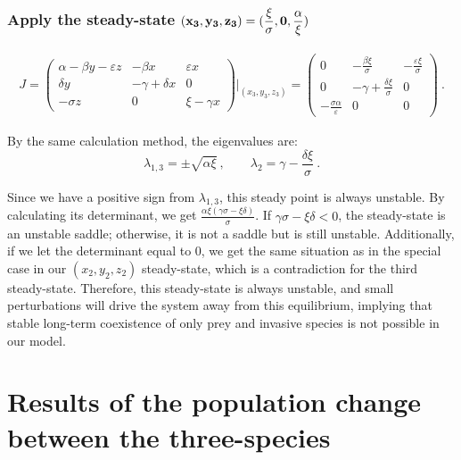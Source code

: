 \documentclass{article}
\begin{document}
\subsubsection*{Apply the steady-state $\bf(x_3,y_3,z_3) = (\dfrac{\xi}{\sigma}, 0, \dfrac{\alpha}{\xi})$}

\begin{align}
J = \begin{pmatrix}
\alpha - \beta y - \varepsilon z & -\beta x & \varepsilon x \\
\delta y & -\gamma + \delta x  & 0\\
- \sigma z & 0 & \xi - \gamma x
\end{pmatrix}\Big|_{(x_3, y_3,z_3)}
= \begin{pmatrix}
0 & -\frac{\beta \xi}{\sigma} & -\frac{\varepsilon \xi}{\sigma} \\
0 & -\gamma + \frac{\delta \xi}{\sigma} & 0\\
-\frac{\sigma \alpha}{\varepsilon} & 0 & 0
\end{pmatrix} \ .
\tag{3.3}
\end{align}

\noindent By the same calculation method, the eigenvalues are:
$$\lambda_{1,3} = \pm \sqrt{\alpha \xi}\ ,  \qquad \lambda_2 = \gamma - \frac{\delta \xi}{\sigma} \ .$$

\noindent Since we have a positive sign from $\lambda_{1,3}$, this steady point is always unstable. By calculating its determinant, we get $\frac{\alpha \xi (\gamma \sigma - \xi \delta)}{\sigma}$. If $\gamma \sigma - \xi \delta < 0$, the steady-state is an unstable saddle; otherwise, it is not a saddle but is still unstable. Additionally, if we let the determinant equal to 0, we get the same situation as in the special case in our $(x_2,y_2,z_2)$ steady-state, which is a contradiction for the third steady-state. Therefore, this steady-state is always unstable, and small perturbations will drive the system away from this equilibrium, implying that stable long-term coexistence of only prey and invasive species is not possible in our model. 

\section{Results of the population change between the three-species} %
\end{document}

